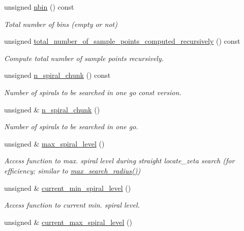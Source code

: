 \begin{DoxyCompactItemize}
unsigned \hyperlink{classNonRefineableBinArray_af591a06dbe5bbf379c5a52d7a2f1d611}{nbin} () const
\begin{DoxyCompactList}\small\item\em Total number of bins (empty or not) \end{DoxyCompactList}\item 
unsigned \hyperlink{classNonRefineableBinArray_a937a83d5482e159270b498b4b15a1e48}{total\+\_\+number\+\_\+of\+\_\+sample\+\_\+points\+\_\+computed\+\_\+recursively} () const
\begin{DoxyCompactList}\small\item\em Compute total number of sample points recursively. \end{DoxyCompactList}\item 
unsigned \hyperlink{classNonRefineableBinArray_a0ece8aca5700546a90d9a48cd932f3e6}{n\+\_\+spiral\+\_\+chunk} () const
\begin{DoxyCompactList}\small\item\em Number of spirals to be searched in one go const version. \end{DoxyCompactList}\item 
unsigned \& \hyperlink{classNonRefineableBinArray_ac5bd768e7644fc4d3a6af407e4c5e9ce}{n\+\_\+spiral\+\_\+chunk} ()
\begin{DoxyCompactList}\small\item\em Number of spirals to be searched in one go. \end{DoxyCompactList}\item 
unsigned \& \hyperlink{classNonRefineableBinArray_ac10de308f4d85c5f28d35d598ec51e32}{max\+\_\+spiral\+\_\+level} ()
\begin{DoxyCompactList}\small\item\em Access function to max. spiral level during straight locate\+\_\+zeta search (for efficiency; similar to \hyperlink{classSamplePointContainer_ad38b50923288cd35ff5e24ada05d0c59}{max\+\_\+search\+\_\+radius()}) \end{DoxyCompactList}\item 
unsigned \& \hyperlink{classNonRefineableBinArray_ae014f4db4cfc34a36e913a91a44ea66a}{current\+\_\+min\+\_\+spiral\+\_\+level} ()
\begin{DoxyCompactList}\small\item\em Access function to current min. spiral level. \end{DoxyCompactList}\item 
unsigned \& \hyperlink{classNonRefineableBinArray_ac3f611d0535d74a65834b4ec9c81a8ca}{current\+\_\+max\+\_\+spiral\+\_\+level} ()

\end{DoxyCompactItemize}

